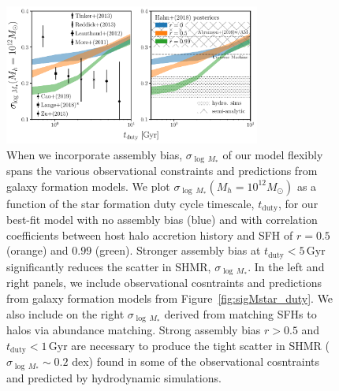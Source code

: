 \documentclass[12pt, letterpaper, preprint, tighten]{aastex62}
\begin{document}
\begin{figure}
\begin{center}
\includegraphics[width=0.75\textwidth]{figs/SHMRscatter_tduty_abias2.pdf}
    \caption{When we incorporate assembly bias, $\sigma_{\log\,M_*}$ of our 
    model flexibly spans the various observational constraints and predictions 
    from galaxy formation models. We plot $\sigma_{\log\,M_*}(M_h=10^{12}M_\odot)$ 
    as a function of the star formation duty cycle timescale, $t_\mathrm{duty}$,
    for our best-fit model with no assembly bias (blue) and with correlation 
    coefficients between host halo accretion history and SFH of $r = 0.5$ 
    (orange) and $0.99$ (green).  Stronger assembly bias at 
    $t_\mathrm{duty} < 5\,\mathrm{Gyr}$ significantly reduces the scatter 
    in SHMR, $\sigma_{\log\,M_*}$. In the left and right panels, we include observational 
    cosntraints and predictions from galaxy formation models from 
    Figure~\ref{fig:sigMstar_duty}. We also include on the right $\sigma_{\log\,M_*}$ 
    derived from matching \cite{abramson2016} SFHs to halos via abundance matching.
    Strong assembly bias $r > 0.5$ and $t_\mathrm{duty} < 1\,\mathrm{Gyr}$ are necessary  
    to produce the tight scatter in SHMR ($\sigma_{\log\,M_*}\sim 0.2$ dex) found in 
    some of the observational cosntraints and predicted by hydrodynamic simulations. 
    }
\label{fig:sigMstar_duty_abias}
\end{center}
\end{figure}
\end{document}
